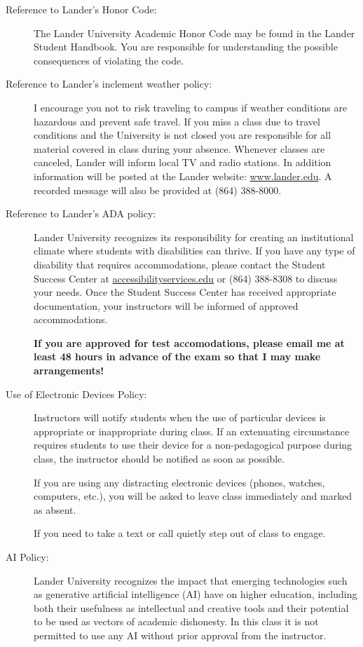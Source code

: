 \documentclass{article}
\begin{document}
\begin{description}
\item[Reference to Lander’s Honor Code:]
  The Lander University Academic Honor Code may be found in the Lander Student Handbook. You are responsible for understanding the possible consequences of violating the code.

\item[Reference to Lander’s inclement weather policy:]
  I encourage you not to risk traveling to campus if weather conditions are hazardous and prevent safe travel. If you miss a class due to travel conditions and the University is not closed you are responsible for all material covered in class during your absence. Whenever classes are canceled, Lander will inform local TV and radio stations. In addition information will be posted at the Lander website: \href{www.lander.edu}{www.lander.edu}. A recorded message will also be provided at (864) 388-8000.

\item[Reference to Lander’s ADA policy:]
  Lander University recognizes its responsibility for creating an
  institutional climate where students with disabilities can
  thrive. If you have any type of disability that requires
  accommodations, please contact the Student Success Center at
  \href{mailto:accessibilityservices@lander.edu}{accessibilityservices\allowbreak@lander.edu}
  or (864) 388-8308 to discuss your needs. Once the Student Success
  Center has received appropriate documentation, your instructors
  will be informed of approved accommodations.

  \textbf{If you are approved for test accomodations, please email me at
  least 48 hours in advance of the exam so that I may make arrangements!}

\item[Use of Electronic Devices Policy:]
  Instructors will notify students when the use of particular devices is appropriate or inappropriate during class. If an extenuating circumstance requires students to use their device for a non-pedagogical purpose during class, the instructor should be notified as soon as possible.

  If you are using any distracting electronic devices (phones, watches, computers, etc.), you will be asked to leave class immediately and marked as absent.

  If you need to take a text or call quietly step out of class to engage.

\item[AI Policy:]
  Lander University recognizes the impact that emerging technologies such as generative artificial intelligence (AI) have on higher education, including both their usefulness as intellectual and creative tools and their potential to be used as vectors of academic dishonesty. In this class it is not permitted to use any AI without prior approval from the instructor.


\end{description}
\end{document}
